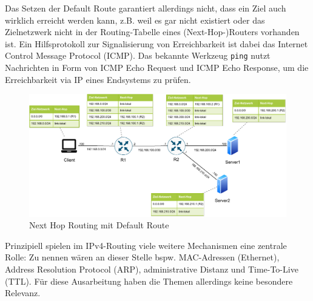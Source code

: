 Das Setzen der Default Route garantiert allerdings nicht, dass ein Ziel auch wirklich erreicht werden kann, z.B. weil es gar nicht existiert oder das Zielnetzwerk nicht in der Routing-Tabelle eines (Next-Hop-)Routers vorhanden ist. Ein Hilfsprotokoll zur Signalisierung von Erreichbarkeit ist dabei das Internet Control Message Protocol (\gls{ICMP}). Das bekannte Werkzeug \texttt{ping} nutzt Nachrichten in Form von \gls{ICMP} Echo Request und \gls{ICMP} Echo Response, um die Erreichbarkeit via IP eines Endsystems zu prüfen.
\begin{figure}[h]
  \centering
  \includegraphics[scale=0.85]{Figures/next_hop_routing_default_route.pdf}
  \caption{Next Hop Routing mit Default Route}
  \label{grafik: next_hop_routing_with_default_route}
\end{figure}\FloatBarrier

Prinzipiell spielen im IPv4-Routing viele weitere Mechanismen eine zentrale Rolle: Zu nennen wären an dieser Stelle bspw. MAC-Adressen (Ethernet), Address Resolution Protocol (ARP), administrative Distanz und Time-To-Live (TTL). Für diese Ausarbeitung haben die Themen allerdings keine besondere Relevanz.\\

